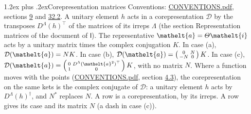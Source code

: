 \documentclass[10pt,a4paper]{article}
\makeatletter
\renewcommand\section{\@startsection{section}{1}{\z@}{-3ex plus -1ex minus -.2ex}%
  {1.2ex plus .2ex}{\normalfont\large\sffamily\bfseries\color{parttitle}}}
\numberwithin{equation}{section}
\newcommand{\eltfont}[1]{{\let\sigma\eltsigma\mathelt{#1}}}
\newcommand{\grp}[1]{\mathsf{#1}}
\newcommand{\elt}[1]{\eltfont{#1}}
\makeatother
\begin{document}
\section{Corepresentation matrices}\label{s:corep_matrices}
Conventions: \href{../../CONVENTIONS.pdf}{CONVENTIONS.pdf}, sections \href{../../../rotation/CONVENTIONS.pdf\#conv.9}{9} and \href{../../CONVENTIONS.pdf\#conv.32.2}{32.2}.
A unitary element $h$ acts in a corepresentation $\mathcal{D}$ by the transposes $D^{\Lambda}(h)^{\top}$ of the matrices of its irreps $\Lambda$ (the section Representation matrices of the document of \href{../../../rotation/data/pdf/I.pdf}{$\grp{I}$}). The representative $\elt{a} = \varTheta\elt{i}$ acts by a unitary matrix times the complex conjugation $K$.
In case (a), $\mathcal{D}(\elt{a}) = NK$. In case (b), $\mathcal{D}(\elt{a}) = \left(\begin{smallmatrix} 0 & N \\ -N & 0 \end{smallmatrix}\right) K$. In case (c), $\mathcal{D}(\elt{a}) = \left(\begin{smallmatrix} 0 & D^{\Lambda}(\elt{a}^2)^{\top} \\ 1 & 0 \end{smallmatrix}\right) K$, with no matrix $N$.
Where a function moves with the points (\href{../../CONVENTIONS.pdf}{CONVENTIONS.pdf}, section \href{../../../rotation/CONVENTIONS.pdf\#conv.4.3}{4.3}), the corepresentation on the same kets is the complex conjugate of $\mathcal{D}$: a unitary element $h$ acts by $D^{\Lambda}(h)^{\dagger}$, and $N^{*}$ replaces $N$.
A row is a corepresentation, by its irreps. A row gives its case and its matrix $N$ (a dash in case (c)).
\end{document}
